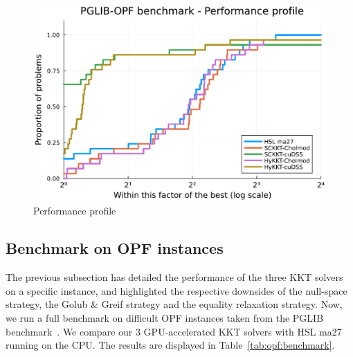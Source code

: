 \begin{figure}[!ht]
  \centering
  \begin{minipage}{.5\textwidth}
  \includegraphics[width=\textwidth]{../figures/pprof.pdf} \qquad
  \end{minipage}\hfill
  \begin{minipage}{.5\textwidth}
  \end{minipage}
  \caption{Performance profile}
\end{figure}





\subsection{Benchmark on OPF instances}
The previous subsection has detailed the performance of the
three KKT solvers on a specific instance, and highlighted
the respective downsides of the null-space strategy,
the Golub \& Greif strategy and the equality relaxation strategy.
Now, we run a full benchmark on difficult OPF instances taken
from the PGLIB benchmark~\cite{babaeinejadsarookolaee2019power}.
We compare our 3 GPU-accelerated KKT solvers with HSL ma27 running
on the CPU.
The results are displayed in Table~\ref{tab:opf:benchmark}.

